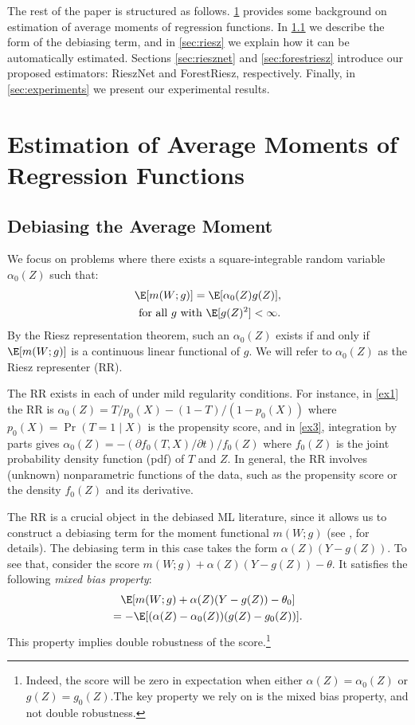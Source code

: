\documentclass[nohyperref]{article}
\theoremstyle{plain}
\theoremstyle{definition}
\theoremstyle{remark}
\begin{document}
The rest of the paper is structured as follows. \cref{sec:estimation} provides some background on estimation of average moments of regression functions. In \ref{sec:debiasing} we describe the form of the debiasing term, and in \ref{sec:riesz} we explain how it can be automatically estimated. Sections \ref{sec:riesznet} and \ref{sec:forestriesz} introduce our proposed estimators: RieszNet and ForestRiesz, respectively. Finally, in \cref{sec:experiments} we present our experimental results.

\section{Estimation of Average Moments of Regression Functions}\label{sec:estimation}

\subsection{Debiasing the Average Moment} \label{sec:debiasing}
We focus on problems where there exists a square-integrable random variable  $\alpha_0(Z)$  such that:
\begin{gather*}
    \E[m(W; g)]=\E[\alpha_0(Z)g(Z)], \\ \text{ for all $g$ with } \E[g(Z)^2]<\infty.
\end{gather*}
By the Riesz representation theorem, such an $\alpha_0(Z)$ exists if and only if $\E[m(W;g)]$ is a continuous linear functional of $g$. We will refer to $\alpha_0(Z)$ as the Riesz representer (RR). 

The RR exists in each of  under mild regularity conditions. For instance, in \cref{ex1} the RR is $\alpha_0(Z) = T/p_0(X) - (1-T)/(1-p_0(X))$ where $p_0(X)=\Pr(T=1 \mid X)$ is the propensity score, and in \cref{ex3}, integration by parts gives $\alpha_0(Z)=-\left(\partial f_0(T,X)/ \partial t\right)/f_0(Z)$ where $f_0(Z)$ is the joint probability density function (pdf) of $T$ and $Z$. In general, the RR involves (unknown) nonparametric functions of the data, such as the propensity score or the density $f_0(Z)$ and its derivative.

The RR is a crucial object in the debiased ML literature, since it allows us to construct a debiasing term for the moment functional $m(W; g)$ (see \citealp{chernozhukov2018double}, for details). The debiasing term in this case takes the form $\alpha(Z) (Y - g(Z))$. To see that, consider the score $m(W; g) + \alpha(Z)(Y-g(Z))-\theta$. It satisfies the following \textit{mixed bias property}:
\begin{multline*}
    \E[m(W; g) + \alpha(Z)(Y-g(Z)) - \theta_0] \\ =
    -\E[(\alpha(Z)-\alpha_0(Z))(g(Z)-g_0(Z))].
\end{multline*}
This property implies double robustness of the score.\footnote{Indeed, the score will be zero in expectation when either $\alpha(Z) = \alpha_0(Z)$ or $g(Z) = g_0(Z)$.The key property we rely on is the mixed bias property, and not double robustness.} 
\end{document}
